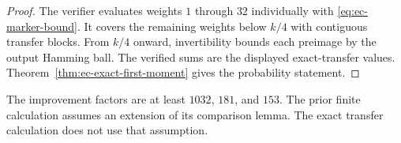 \begin{proof}
The verifier evaluates weights $1$ through $32$ individually with
\eqref{eq:ec-marker-bound}.  It covers the remaining weights below $k/4$
with contiguous transfer blocks.  From $k/4$ onward, invertibility bounds each
preimage by the output Hamming ball.  The verified sums are the displayed
exact-transfer values.  Theorem~\ref{thm:ec-exact-first-moment} gives the
probability statement.
\end{proof}

The improvement factors are at least $1032$, $181$, and $153$.  The prior
finite calculation assumes an extension of its comparison lemma.  The exact
transfer calculation does not use that assumption.
